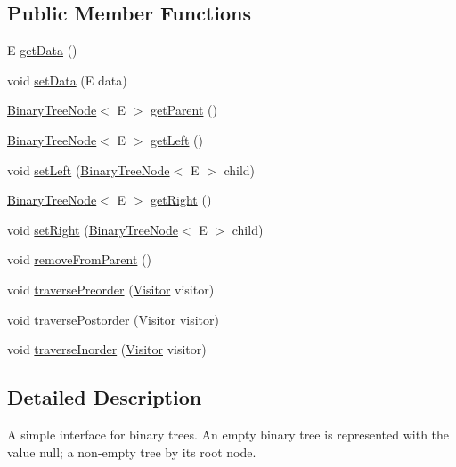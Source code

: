 \subsection*{Public Member Functions}
\begin{DoxyCompactItemize}
\item 
E \hyperlink{interface_binary_tree_node_a5a4d14c6bbf570de73e0f1a43d98d672}{get\+Data} ()
\item 
void \hyperlink{interface_binary_tree_node_accbc98503745f10ebe72ea78c9a15669}{set\+Data} (E data)
\item 
\hyperlink{interface_binary_tree_node}{Binary\+Tree\+Node}$<$ E $>$ \hyperlink{interface_binary_tree_node_a4a13b77afd729f88fc58fb9fa03c2c1e}{get\+Parent} ()
\item 
\hyperlink{interface_binary_tree_node}{Binary\+Tree\+Node}$<$ E $>$ \hyperlink{interface_binary_tree_node_a4ec154631f398146d0216be244aa80a3}{get\+Left} ()
\item 
void \hyperlink{interface_binary_tree_node_a746af1f08a685aaff3306f588fc0a5d0}{set\+Left} (\hyperlink{interface_binary_tree_node}{Binary\+Tree\+Node}$<$ E $>$ child)
\item 
\hyperlink{interface_binary_tree_node}{Binary\+Tree\+Node}$<$ E $>$ \hyperlink{interface_binary_tree_node_adaa5e760f918e25857153371cb7e1e7e}{get\+Right} ()
\item 
void \hyperlink{interface_binary_tree_node_a373da8799e503a1881b6569b3ac9a03f}{set\+Right} (\hyperlink{interface_binary_tree_node}{Binary\+Tree\+Node}$<$ E $>$ child)
\item 
void \hyperlink{interface_binary_tree_node_aca847d1cf4992837220a2f2ae2232a1d}{remove\+From\+Parent} ()
\item 
void \hyperlink{interface_binary_tree_node_a663a53b5d44f02f42c62aa8adaee09a1}{traverse\+Preorder} (\hyperlink{interface_binary_tree_node_1_1_visitor}{Visitor} visitor)
\item 
void \hyperlink{interface_binary_tree_node_a0a676acf35bdf91a294fd3169936c515}{traverse\+Postorder} (\hyperlink{interface_binary_tree_node_1_1_visitor}{Visitor} visitor)
\item 
void \hyperlink{interface_binary_tree_node_aec8c26794367445b02a5dcf5194c0df5}{traverse\+Inorder} (\hyperlink{interface_binary_tree_node_1_1_visitor}{Visitor} visitor)
\end{DoxyCompactItemize}


\subsection{Detailed Description}
A simple interface for binary trees. An empty binary tree is represented with the value null; a non-\/empty tree by its root node. 

